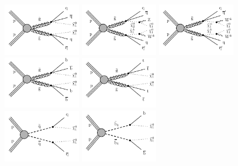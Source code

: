   \begin{figure}[h!]
    \centering
    \includegraphics[width=0.3\textwidth]{figures/MT2_2019/Figure_007-a}
    \includegraphics[width=0.3\textwidth]{figures/MT2_2019/Figure_007-b}
    \includegraphics[width=0.3\textwidth]{figures/MT2_2019/Figure_007-c}\\
    \includegraphics[width=0.3\textwidth]{figures/MT2_2019/Figure_007-d}
    \includegraphics[width=0.3\textwidth]{figures/MT2_2019/Figure_007-e} \\
    \includegraphics[width=0.3\textwidth]{figures/MT2_2019/Figure_007-f}
    \includegraphics[width=0.3\textwidth]{figures/MT2_2019/Figure_007-g}

\end{figure}
